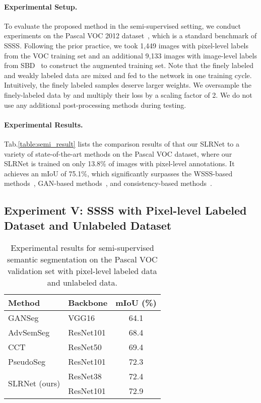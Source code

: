 \documentclass[twocolumn]{svjour3}          \smartqed  \usepackage{graphicx}
\makeatletter
\newcommand{\Tab}{Tab.\@\xspace}
\makeatother
\begin{document}
\paragraph{Experimental Setup.}
To evaluate the proposed method in the semi-supervised setting, we conduct experiments on the Pascal VOC 2012 dataset~\citep{EveringhamGWWZ10:VOC}, which is a standard benchmark of SSSS.
Following the prior practice, we took 1,449 images with pixel-level labels from the VOC training set and an additional 9,133 images with image-level labels from SBD~\citep{HariharanABMM11:SBD} to construct the augmented training set.
Note that the finely labeled and weakly labeled data are mixed and fed to the network in one training cycle.
Intuitively, the finely labeled samples deserve larger weights.
We oversample the finely-labeled data by  and multiply their loss by a scaling factor of 2.
We do not use any additional post-processing methods during testing.

\paragraph{Experimental Results.}
\Tab\ref{table:semi_result} lists the comparison results of that our SLRNet to a variety of state-of-the-art methods on the Pascal VOC dataset, where our SLRNet is trained on only 13.8\% of images with pixel-level annotations. It achieves an mIoU of 75.1\%, which significantly surpasses the WSSS-based methods~\citep{HuangWWLW18:DSRG,WeiXSJFH18:mdc,LeeKLLY19:FickleNet}, GAN-based methods~\citep{SoulySS17:GANSeg}, and consistency-based methods~\citep{OualiHT20:CCT,zou2020:pseudoseg}. 



\subsection{Experiment V: SSSS with Pixel-level Labeled Dataset and Unlabeled Dataset}
\begin{table}[!h]
  \begin{tabularx}{\linewidth}{@{}Xlc@{}}
  \toprule
  Method & Backbone & {mIoU (\%)} \\
  \midrule
  GANSeg  \tiny\citep{SoulySS17:GANSeg}  & VGG16  &  64.1  \\
  AdvSemSeg \tiny\citep{HungTLL018:AdvSemSeg}   & ResNet101  &  68.4  \\
  CCT \tiny\citep{OualiHT20:CCT} & ResNet50  &  69.4  \\
  PseudoSeg \tiny\citep{zou2020:pseudoseg} & ResNet101  &  72.3  \\
  \midrule 
  \multirow{2}{*}{SLRNet (ours)} &  {ResNet38}   & {72.4} \\
   &  {ResNet101}  & {72.9} \\
  \bottomrule
  \end{tabularx}
  \caption{Experimental results for semi-supervised semantic segmentation on the Pascal VOC validation set with  pixel-level labeled data  and  unlabeled data.}
  \label{table:semi_result_wo_cls}
\end{table}
\end{document}

